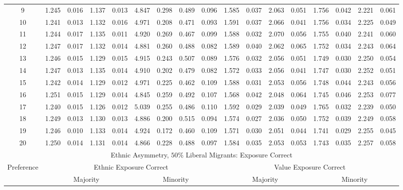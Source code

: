 \documentclass{article}
\begin{document}
\begin{table}[H]
{\begin{tabular}{|c|c|c|c|c|c|c|c|c|c|c|c|c|c|c|c|c|}
     9 & 1.245 & 0.016 & 1.137 & 0.013 & 4.847 & 0.298 & 0.489 & 0.096 & 1.585 & 0.037 & 2.063 & 0.051 & 1.756 & 0.042 & 2.221 & 0.061 \\ 
    10 & 1.241 & 0.013 & 1.132 & 0.016 & 4.971 & 0.208 & 0.471 & 0.093 & 1.591 & 0.037 & 2.066 & 0.041 & 1.756 & 0.034 & 2.225 & 0.049 \\ 
    11 & 1.244 & 0.017 & 1.135 & 0.011 & 4.920 & 0.269 & 0.467 & 0.099 & 1.588 & 0.032 & 2.070 & 0.056 & 1.755 & 0.040 & 2.241 & 0.060 \\ 
    12 & 1.247 & 0.017 & 1.132 & 0.014 & 4.881 & 0.260 & 0.488 & 0.082 & 1.589 & 0.040 & 2.062 & 0.065 & 1.752 & 0.034 & 2.243 & 0.064 \\ 
    13 & 1.246 & 0.015 & 1.129 & 0.015 & 4.915 & 0.243 & 0.507 & 0.089 & 1.576 & 0.032 & 2.056 & 0.051 & 1.749 & 0.030 & 2.250 & 0.054 \\ 
    14 & 1.247 & 0.013 & 1.135 & 0.014 & 4.910 & 0.202 & 0.479 & 0.082 & 1.572 & 0.033 & 2.056 & 0.041 & 1.747 & 0.030 & 2.252 & 0.051 \\ 
    15 & 1.242 & 0.014 & 1.129 & 0.012 & 4.971 & 0.225 & 0.462 & 0.109 & 1.588 & 0.031 & 2.053 & 0.056 & 1.748 & 0.044 & 2.243 & 0.056 \\ 
    16 & 1.251 & 0.015 & 1.129 & 0.014 & 4.845 & 0.259 & 0.492 & 0.107 & 1.568 & 0.042 & 2.048 & 0.064 & 1.745 & 0.046 & 2.253 & 0.077 \\ 
    17 & 1.240 & 0.015 & 1.126 & 0.012 & 5.039 & 0.255 & 0.486 & 0.110 & 1.592 & 0.029 & 2.039 & 0.049 & 1.765 & 0.032 & 2.239 & 0.050 \\ 
    18 & 1.249 & 0.013 & 1.130 & 0.013 & 4.886 & 0.200 & 0.515 & 0.094 & 1.574 & 0.027 & 2.036 & 0.050 & 1.752 & 0.039 & 2.249 & 0.058 \\ 
    19 & 1.246 & 0.010 & 1.133 & 0.014 & 4.924 & 0.172 & 0.460 & 0.109 & 1.571 & 0.030 & 2.051 & 0.044 & 1.741 & 0.029 & 2.255 & 0.045 \\ 
    20 & 1.250 & 0.014 & 1.131 & 0.014 & 4.866 & 0.228 & 0.488 & 0.097 & 1.584 & 0.035 & 2.053 & 0.053 & 1.743 & 0.035 & 2.257 & 0.058 \\ 
   \hline
    \multicolumn{17}{|c|}{Ethnic Asymmetry, $50 \%$ Liberal Migrants: Exposure Correct}  \\\hline
 Preference &  \multicolumn{8}{|c|}{Ethnic Exposure Correct} & \multicolumn{8}{|c|}{Value Exposure Correct}   \\\hline
 & \multicolumn{4}{|c|}{Majority} & \multicolumn{4}{|c|}{Minority}  & \multicolumn{4}{|c|}{Majority} & \multicolumn{4}{|c|}{Minority}  \\

\end{tabular}}
\end{table}
\end{document}
